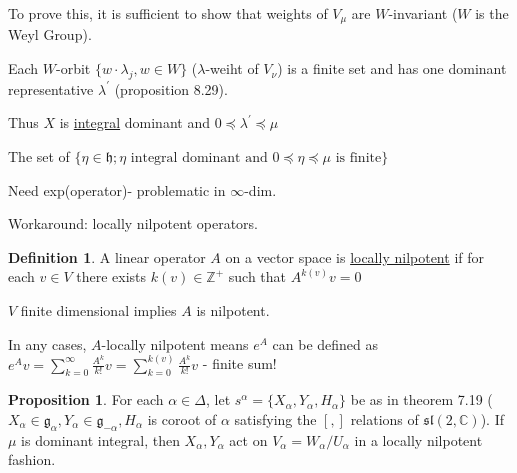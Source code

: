 \documentclass{article}
\theoremstyle{definition}
\newtheorem{definition}{Definition}
\newtheorem{proposition}{Proposition}
\begin{document}
To prove this, it is sufficient to show that weights of \(V_\mu\) are \(W\)-invariant (\(W\) is the Weyl Group).

Each \(W\)-orbit \(\{ w\cdot \lambda_j, w\in W \} \) (\(\lambda\)-weiht of \(V_\nu\)) is a finite set and has one dominant representative \(\lambda^{\prime} \) (proposition 8.29).

Thus \(X\) is \underline{integral} dominant and \(0 \preceq \lambda ^{\prime}  \preceq \mu\)

The set of \(\{ \eta \in \mathfrak{h} ; \eta \text{ integral dominant and } 0 \preceq \eta \preceq \mu \text{ is finite}  \} \) 

Need exp(operator)- problematic in \(\infty\)-dim.

Workaround: locally nilpotent operators.

\begin{definition}
    A linear operator \(A\) on a vector space is \underline{locally nilpotent} if for each \(v\in V\) there exists \(k(v)\in\mathbb{Z}^+\) such that \(A^{k(v)}v=0\) 
    
    \(V\) finite dimensional implies \(A\) is nilpotent.
\end{definition}

In any cases, \(A\)-locally nilpotent means \(e^A\) can be defined as \(e^A v = \sum_{k=0}^{\infty} \frac{A^k}{k!} v = \sum_{k=0}^{k(v)}\frac{A^k}{k!}v\) - finite sum! 

\begin{proposition}
    For each \(\alpha \in \Delta\), let \(s^\alpha = \{ X_\alpha , Y_\alpha , H_\alpha \} \) be as in theorem 7.19 (\(X_\alpha \in \mathfrak{g}_\alpha , Y_\alpha \in \mathfrak{g} _{-\alpha}, H_\alpha\) is coroot of \(\alpha\) satisfying the \([,]\) relations of \(\mathfrak{sl}(2,\mathbb{C})\)). If \(\mu\) is dominant integral, then \(X_\alpha, Y_\alpha\) act on \(V_\alpha= W_\alpha / U_\alpha\) in a locally nilpotent fashion.    
\end{proposition}
\end{document}
